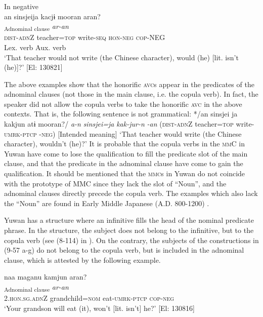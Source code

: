\ex  In negative\\
 \gllll  an  sinsjeija  kacjɨ  mooran  aran?\\
    [\textit{a-n}  \textit{sinsjei=ja}  \textit{kak-tɨ}  \textit{moor-an}]\textsubscript{Adnominal clause}  \textit{ar-an}\\
    \textsc{dist}-\textsc{adn}Z  teacher=\textsc{top}  write-\textsc{seq}  \textsc{hon}-\textsc{neg}  \textsc{cop}-NEG\\
     {}  {} {Lex. verb}  {Aux. verb}\\
    \glt     ‘That teacher would not write (the Chinese character), would (he) [lit. isn’t (he)]?’ [El: 130821]
    \z
\z

The above examples show that the honorific \textsc{avc}s appear in the predicates of the adnominal clauses (not those in the main clause, i.e. the copula verb). In fact, the speaker did not allow the copula verbs to take the honorific \textsc{avc} in the above contexts. That is, the following sentence is not grammatical: */an sinsjei ja kakjun atɨ mooran?/ \textit{a-n} \textit{sinsjei=ja} \textit{kak-jur-n} \textit{} \textit{-an} (\textsc{dist}-\textsc{adn}Z teacher=\textsc{top} write-\textsc{umrk}-\textsc{ptcp} -\textsc{neg}) [Intended meaning] ‘That teacher would write (the Chinese character), wouldn’t (he)?’ It is probable that the copula verbs in the \textsc{mm}C in Yuwan have come to lose the qualification to fill the predicate slot of the main clause, and that the predicate in the adnominal clause have come to gain the qualification. It should be mentioned that the \textsc{mmc}s in Yuwan do not coincide with the prototype of MMC since they lack the slot of “Noun”, and the adnominal clauses directly precede the copula verb. The examples which also lack the “Noun” are found in Early Middle Japanese (A.D. 800-1200) \citep[203-205]{Miyachi2013}.

Yuwan has a structure where an infinitive fills the head of the nominal predicate phrase. In the structure, the subject does not belong to the infinitive, but to the copula verb (see (8-114) in ). On the contrary, the subjects of the constructions in (9-57 a-g) do not belong to the copula verb, but is included in the adnominal clause, which is attested by the following example.

\ea    \label{ex:9.59}
 \glll  naa  maganu  kamjun  aran?\\
    [\textit{naa}  \textit{maga=\Highlight{nu}}  \textit{kam-jur-n}]\textsubscript{Adnominal clause}  \textit{ar-an}\\
    2.\textsc{hon}.\textsc{sg}.\textsc{adn}Z  grandchild=\textsc{nom}  eat-\textsc{umrk}-\textsc{ptcp}  \textsc{cop}-\textsc{neg}\\
    \glt     ‘Your grandson will eat (it), won’t [lit. isn’t] he?’ [El: 130816]
\z

